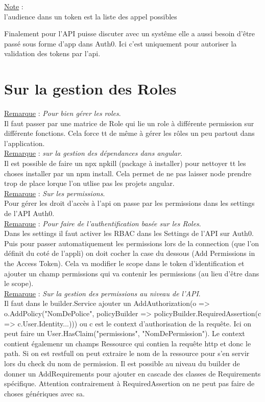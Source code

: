 \documentclass[a4paper,12pt,twoside]{article}
\newcommand{\rem}[2]{\noindent\underline{Remarque} : \textit{#1}.\\ \indent #2}
\newcommand{\note}[1]{\noindent\underline{Note} : \\ \indent #1}
\begin{document}
\note{l'audience dans un token est la liste des appel possibles}

Finalement pour l'API puisse discuter avec un systême elle a aussi besoin d'être passé sous forme d'app dans Auth0. Ici c'est uniquement pour autoriser la validation des tokens par l'api.\\

\section{Sur la gestion des Roles}

\rem{Pour bien gérer les roles}{Il faut passer par une matrice de Role qui lie un role à différente permission sur différente fonctions. Cela force tt de même à gérer les rôles un peu partout dans l'application.}\\

\rem{sur la gestion des dépendances dans angular}{Il est possible de faire un npx npkill (package à installer) pour nettoyer tt les choses installer par un npm install. Cela permet de ne pas laisser node prendre trop de place lorque l'on utlise pas les projets angular.}\\

\rem{Sur les permissions}{Pour gérer les droit d'accès à l'api on passe par les permissions dans les settings de l'API Auth0.}\\

\rem{Pour faire de l'authentification basée sur les Roles}{Dans les settings il faut activer les RBAC dans les Settings de l'API sur Auth0. Puis pour passer automatiquement les permissions lors de la connection (que l'on définit du coté  de l'appli) on doit cocher la case du dessous (Add Permissions in the Access Token). Cela va modifier le scope dans le token d'identification et ajouter un champ permissions qui va contenir les permissions (au lieu d'être dans le scope).}\\

\rem{Sur la gestion des permissions au niveau de l'API}{Il faut dans le builder.Service ajouter un AddAuthorization(o => o.AddPolicy("NomDePolice", policyBuilder => policyBuilder.RequiredAssertion(c => c.User.Identity...))) ou c est le context d'authorisation de la requête. Ici on peut faire un User.HasClaim("permissions", "NomDePermission"). Le context contient égalemenr un champs Ressource qui contien la requête http et donc le path. Si on est restfull on peut extraire le nom de la ressource pour s'en servir lors du check du nom de permission. Il est possible au niveau du builder de donner un AddRequirements pour ajouter en cascade des classes de Requirements spécifique. Attention contrairement à RequiredAssertion on ne peut pas faire de choses génériques avec sa.}\\
\end{document}
